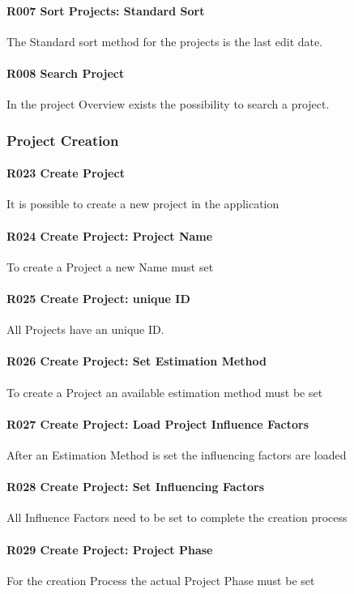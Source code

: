 \paragraph{R007 Sort Projects: Standard Sort}
The Standard  sort method for the projects is the last edit date.
\paragraph{R008 Search Project}
In the project Overview exists the possibility to search a project.

\subsubsection{Project Creation}
\paragraph{R023 Create Project}
It is possible to create a new project in the application
\paragraph{R024 Create Project: Project Name}
To create a Project a new Name must set

\paragraph{R025 Create Project: unique ID}
All Projects have an unique ID.

\paragraph{R026 Create Project: Set Estimation Method}
To create a Project an available estimation method must be set

\paragraph{R027 Create Project: Load Project Influence Factors}
After an Estimation Method is set the influencing factors are loaded

\paragraph{R028 Create Project: Set Influencing Factors}
All Influence Factors need to be set to complete the creation process

\paragraph{R029 Create Project: Project Phase}
For the creation Process the actual Project Phase must be set

